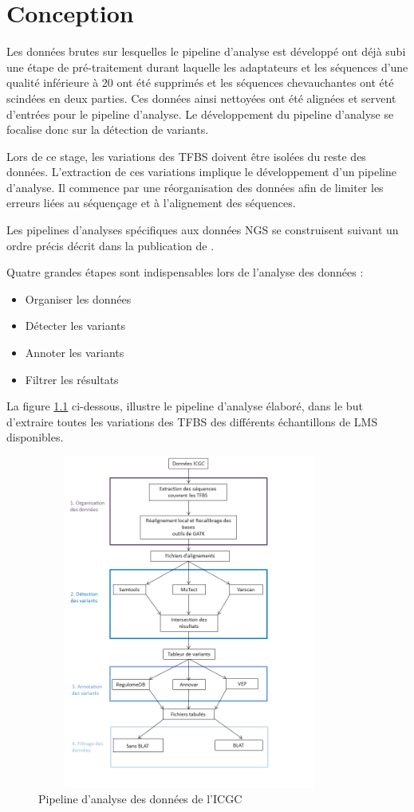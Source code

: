 \chapter{Conception}

Les données brutes sur lesquelles le pipeline d'analyse est développé ont déjà subi une étape de pré-traitement durant laquelle les adaptateurs et les séquences d'une qualité inférieure à 20 ont été supprimés et les séquences chevauchantes ont été scindées en deux parties. Ces données ainsi nettoyées ont été alignées et servent d’entrées pour le pipeline d'analyse. Le développement du pipeline d'analyse se focalise donc sur la détection de variants. 

Lors de ce stage, les variations des TFBS doivent être isolées du reste des données. L'extraction de ces variations implique le développement d'un pipeline d'analyse. Il commence par une réorganisation des données afin de limiter les erreurs liées au séquençage et à l'alignement des séquences.

Les pipelines d'analyses spécifiques aux données NGS se construisent suivant un ordre précis décrit dans la publication de \citet{ref7}.

Quatre grandes étapes sont indispensables lors de l'analyse des données :
\begin{itemize}[label=\textbullet]
\item Organiser les données
\item Détecter les variants
\item Annoter les variants
\item Filtrer les résultats 
\end{itemize}

La figure \ref{fig:pipeline} ci-dessous, illustre le pipeline d'analyse élaboré, dans le but d'extraire toutes les variations des TFBS des différents échantillons de LMS disponibles. 

\begin{figure}[h]
\centering
\includegraphics[width=10cm,height=11cm]{Figures/pipeline.png}
\caption{Pipeline d'analyse des données de l'ICGC}
\label{fig:pipeline}
\end{figure}

